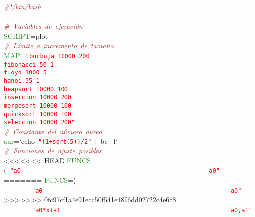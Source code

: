 \noindent
\mbox{}\textit{\textcolor{Brown}{\#!/bin/bash}} \\
\mbox{} \\
\mbox{}\textit{\textcolor{Brown}{\#\ Variables\ de\ ejecución}} \\
\mbox{}\textcolor{ForestGreen}{SCRIPT}\textcolor{BrickRed}{=}plot \\
\mbox{}\textit{\textcolor{Brown}{\#\ Límite\ e\ incremento\ de\ tamaño.}} \\
\mbox{}\textcolor{ForestGreen}{MAP}\textcolor{BrickRed}{=}\texttt{\textcolor{Red}{"{}burbuja\ 10000\ 200}} \\
\mbox{}\texttt{\textcolor{Red}{fibonacci\ 50\ 1}} \\
\mbox{}\texttt{\textcolor{Red}{floyd\ 1000\ 5}} \\
\mbox{}\texttt{\textcolor{Red}{hanoi\ 35\ 1}} \\
\mbox{}\texttt{\textcolor{Red}{heapsort\ 10000\ 100}} \\
\mbox{}\texttt{\textcolor{Red}{insercion\ 10000\ 200}} \\
\mbox{}\texttt{\textcolor{Red}{mergesort\ 10000\ 100}} \\
\mbox{}\texttt{\textcolor{Red}{quicksort\ 10000\ 100}} \\
\mbox{}\texttt{\textcolor{Red}{seleccion\ 10000\ 200"{}}} \\
\mbox{}\textit{\textcolor{Brown}{\#\ Constante\ del\ número\ áureo}} \\
\mbox{}\textcolor{ForestGreen}{aur}\textcolor{BrickRed}{=}`echo\ \texttt{\textcolor{Red}{"{}(1+sqrt(5))/2"{}}}\ \textcolor{BrickRed}{$|$}\ bc\ -l` \\
\mbox{}\textit{\textcolor{Brown}{\#\ Funciones\ de\ ajuste\ posibles}} \\
<<<<<<< HEAD
\mbox{}\textcolor{ForestGreen}{FUNCS}\textcolor{BrickRed}{=(}\ \texttt{\textcolor{Red}{"{}a0\ \ \ \ \ \ \ \ \ \ \ \ \ \ \ \ \ \ \ \ \ \ \ \ \ \ \ \ \ \ \ \ \ \ \ \ \ \ \ \ \ \ \ \ \ \ \ \ \ \ \ \ \ a0"{}}} \\
=======
\mbox{}\textcolor{ForestGreen}{FUNCS}\textcolor{BrickRed}{=(}\  \\
\mbox{}\ \ \ \ \ \ \ \ \texttt{\textcolor{Red}{"{}a0\ \ \ \ \ \ \ \ \ \ \ \ \ \ \ \ \ \ \ \ \ \ \ \ \ \ \ \ \ \ \ \ \ \ \ \ \ \ \ \ \ \ \ \ \ \ \ \ \ \ \ \ \ a0"{}}} \\
>>>>>>> 0fc97cf1a4e91ecc50f541e4896dd02722c4e6c8
\mbox{}\ \ \ \ \ \ \ \ \texttt{\textcolor{Red}{"{}a0*x+a1\ \ \ \ \ \ \ \ \ \ \ \ \ \ \ \ \ \ \ \ \ \ \ \ \ \ \ \ \ \ \ \ \ \ \ \ \ \ \ \ \ \ \ \ \ \ \ \ a0,a1"{}}} \\

